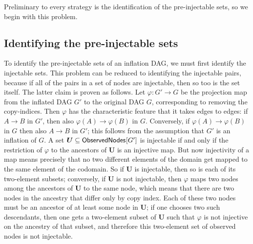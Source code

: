 {

Preliminary to every strategy is the identification of the pre-injectable sets, so we begin with this problem.

\subsection{Identifying the pre-injectable sets}\label{step:findpreinjectable}

To identify the pre-injectable sets of an inflation DAG, we must first identify the injectable sets. This problem can be reduced to identifying the injectable pairs, because if all of the pairs in a set of nodes are injectable, then so too is the set itself.  The latter claim is proven as follows.   
Let $\varphi : G' \to G$ be the projection map from the inflated DAG $G'$ to
the original DAG $G$, corresponding to removing the copy-indices.  Then $\varphi$ has the characteristic feature that it takes edges to edges: if $A  \to B$ in $G'$, then also $\varphi(A) \to \varphi(B)$ in $G$. Conversely, if
$\varphi(A) \to \varphi(B)$ in $G$ then also $A \to B$ in $G'$; this follows from the
assumption that $G'$ is an inflation of $G$. 
A set $\bm{U} \subseteq {\operatorname{\mathsf{ObservedNodes}}_{}}\lbrack G'\rbrack$ is injectable if and only if the
restriction of $\varphi$ to the ancestors of $\bm{U}$ is an injective map. 
But now injectivity of a map means precisely that no two different
elements of the domain get mapped to the same element of the codomain.
So if $\bm{U}$ is injectable, then so is each of its two-element subsets;
conversely, if $\bm{U}$ is not injectable, then $\varphi$ maps two nodes among the
ancestors of $\bm{U}$ to the same node, which means that there are two nodes in the
ancestry that differ only by copy index. Each of these two nodes must be
an ancestor of at least some node in $\bm{U}$; if one chooses two such
descendants, then one gets a two-element subset of $\bm{U}$ such that $\varphi$ is not
injective on the ancestry of that subset, and therefore this two-element
set of observed nodes is not injectable.
\color{black}

}
